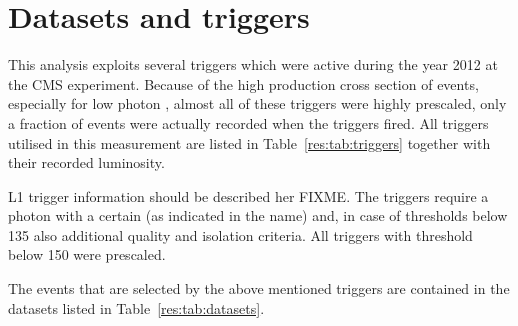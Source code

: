 \section{Datasets and triggers}
\label{res:sec:DatasetsAndTriggers}
This analysis exploits several triggers which were active during the year 2012 at the CMS experiment.
Because of the high production cross section of \GAMJET events, especially for low photon \pt, almost all of these triggers were highly prescaled, \ie only a fraction of events were actually recorded when the triggers fired.
All triggers utilised in this measurement are listed in Table~\ref{res:tab:triggers} together with their recorded luminosity.
\renewcommand{\arraystretch}{1.5}
\begin{table}[!hbt]
\centering
\caption{Single photon triggers together with the recorded luminosity taken the time when they were active and the prescales of the triggers into consideration.}
\label{res:tab:triggers}
\end{table}  
L1 trigger information should be described her FIXME.
The triggers  require a photon with a certain \pt (as indicated in the name) and, in case of thresholds below \mbox{135\gev} also additional quality and isolation criteria. 
All triggers with threshold below \mbox{150\gev} were prescaled.

The events that are selected by the above mentioned triggers are contained in the datasets listed in Table~\ref{res:tab:datasets}.


